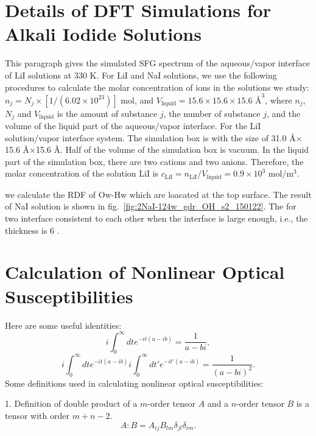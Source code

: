 \section{Details of DFT Simulations for Alkali Iodide Solutions}
This paragraph gives the simulated SFG spectrum of the aqueous/vapor interface of LiI solutions at 330 K.
For LiI and NaI solutions, we use the following procedures to calculate the molar concentration of ions in the solutions we study:
$n_j=N_j\times[1/(6.02\times10^{23})] {\text{ mol}}$, and
$V_{\text{liquid}}=15.6\times15.6\times15.6 \text{ \AA}^3$, 
where $n_j$, $N_j$ and $V_{\text{liquid}}$ is the amount of substance $j$, the number of substance $j$, and the 
volume of the liquid part of the aqueous/vapor interface.  
For the LiI solution/vapor interface system. 
The simulation box is with the size of 31.0 \AA$ \times$15.6 \AA$ \times$15.6 \AA. 
Half of the volume of the simulation box is vacuum. In the liquid part of the simulation box, there are two \Li cations and two \I anions.
Therefore, the molar concentration of the solution LiI is $c_{\text{LiI}}={n_{\text{LiI}}}/{V_\text{liquid}}=0.9\times10^3  \text{ mol}/\text{m}^3$.

we calculate the RDF of Ow-Hw which are loacated at the top surface.   
The result of NaI solution is shown in fig.~\ref{fig:2NaI-124w_gdr_OH_s2_150122}.
The  for two interface consistent to each other when the interface is large enough, i.e., the thickness is 6 \A.


\section{Calculation of Nonlinear Optical Susceptibilities}
Here are some useful identities:\cite{Neipert06}
\begin{equation}
i\int_0^\infty dt e^{-it(a-ib)}=\frac{1}{a-bi},
\label{integral_identity1}
\end{equation}
\begin{equation}
i\int_0^\infty dt e^{-it(a-ib)}i\int_0^\infty dt' e^{-it'(a-ib)}=\frac{1}{(a-bi)^2}.
\label{integral_identity1}
\end{equation}
%
Some definitions used in calculating nonlinear optical susceptibilities:

1. Definition of double product of a $m$-order tensor $A$ and a $n$-order tensor $B$ is a tensor with order $m+n-2$.
\begin{equation}
    A:B=A_{ij}B_{lm}\delta_{jl}\delta_{im}.
\label{tensor_double_product}
\end{equation}

